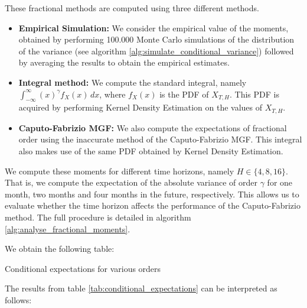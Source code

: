 These fractional methods are computed using three different methods. 
\begin{itemize}
\item \textbf{Empirical Simulation: } We consider the empirical value of the moments, obtained by performing 100.000 Monte Carlo simulations of the distribution of the variance (see algorithm \ref{alg:simulate_conditional_variance}) followed by averaging the results to obtain the empirical estimates.
\item \textbf{Integral method: } We compute the standard integral, namely \(\int_{-\infty}^{\infty} (x)^\gamma f_X(x) \, dx\), where \(f_X(x)\) is the PDF of \(X_{T,H}\). This PDF is acquired by performing Kernel Density Estimation on the values of \(X_{T,H}\).
\item \textbf{Caputo-Fabrizio MGF: } We also compute the expectations of fractional order using the inaccurate method of the Caputo-Fabrizio MGF. This integral also makes use of the same PDF obtained by Kernel Density Estimation.
\end{itemize} 

We compute these moments for different time horizons, namely \(H \in \{4, 8, 16\}\). That is, we compute the expectation of the absolute variance of order \(\gamma\) for one month, two months and four months in the future, respectively. This allows us to evaluate whether the time horizon affects the performance of the Caputo-Fabrizio method. The full procedure is detailed in algorithm \ref{alg:analyse_fractional_moments}.

We obtain the following table:


\begin{table}[H]
    \centering

\caption{Conditional expectations for various orders} 
\label{tab:conditional_expectations}
\end{table}
The results from table \ref{tab:conditional_expectations} can be interpreted as follows:

